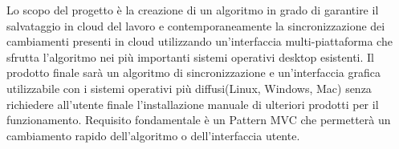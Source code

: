 Lo scopo del progetto è la creazione di un algoritmo in grado di garantire il salvataggio in cloud del lavoro e contemporaneamente la sincronizzazione dei cambiamenti presenti in cloud utilizzando un'interfaccia multi-piattaforma che sfrutta l'algoritmo nei più importanti sistemi operativi desktop esistenti.
Il prodotto finale sarà un algoritmo di sincronizzazione e un'interfaccia grafica utilizzabile con i sistemi operativi più diffusi(Linux, Windows, Mac) senza richiedere all'utente finale l'installazione manuale di ulteriori prodotti per il funzionamento. Requisito fondamentale è un Pattern MVC che permetterà un cambiamento rapido dell'algoritmo o dell'interfaccia utente.
